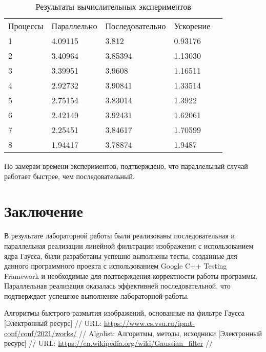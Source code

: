 \documentclass{report}
\begin{document}
\begin{table}[!h]
\caption{Результаты вычислительных экспериментов}
\centering
\begin{tabular}{lllll}
Процессы & Параллельно & Последовательно & Ускорение  \\
1        & 4.09115        & 3.812       & 0.93176     \\
2        & 3.40964        & 3.85394     & 1.13030     \\  
3        & 3.39951        & 3.9608      & 1.16511     \\
4        & 2.92732        & 3.90841     & 1.33514     \\
5        & 2.75154        & 3.83014     & 1.3922       \\
6        & 2.42149        & 3.92431     & 1.62061     \\
7        & 2.25451        & 3.84617     & 1.70599     \\
8        & 1.94417        & 3.78874     & 1.9487
\end{tabular}
\end{table}

\par По замерам времени экспериментов, подтверждено, что параллельный случай работает быстрее, чем последовательный.
\newpage

\section*{Заключение}
В результате лабораторной работы были реализованы последовательная и параллельная реализации линейной фильтрации изображения с использованием ядра Гаусса, были разработаны успешно выполнены тесты, созданные для данного программного проекта с использованием Google C++ Testing Framework и необходимые для подтверждения корректности работы программы. Параллельная реализация оказалась эффективней последовательной, что подтверждает успешное выполнение лабораторной работы.
\newpage

\begin{thebibliography}{1}
 Алгоритмы быстрого размытия изображений, основанные на фильтре Гаусса [Электронный ресурс] // URL: \url {https://www.cs.vsu.ru/ipmt-conf/conf/2021/works/} //
 Algolist: Алгоритмы, методы, исходники [Электронный ресурс] // URL: \url {https://en.wikipedia.org/wiki/Gaussian_filter} //
\end{thebibliography}
\newpage
\end{document}
